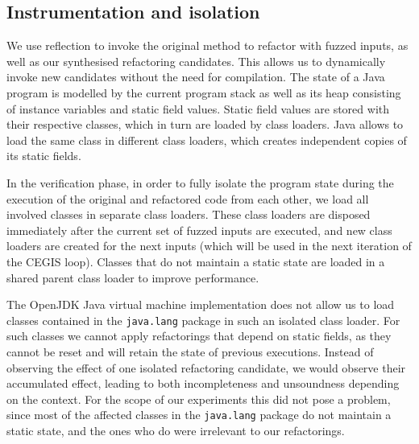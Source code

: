 \documentclass[10pt,conference]{IEEEtran}
\begin{document}
\subsection{Instrumentation and isolation}

We use reflection to invoke the original method to refactor with fuzzed inputs,
as well as our synthesised refactoring candidates. This allows us to dynamically
invoke new candidates without the need for compilation. The state of a Java
program is modelled by the current program stack as well as its heap consisting
of instance variables and static field values. Static field values are stored
with their respective classes, which in turn are loaded by class loaders. Java
allows to load the same class in different class loaders, which creates
independent copies of its static fields.

In the verification phase, in order to fully isolate the program state during the execution of the original and refactored code from each other, we load all involved classes in separate
class loaders. These class loaders are disposed immediately after the current set
of fuzzed inputs are executed, and new class loaders are created for the next
inputs (which will be used in the next iteration of the CEGIS loop).
Classes that do not maintain a static state are loaded in a shared
parent class loader to improve performance.

The OpenJDK Java virtual machine implementation does not allow us to load
classes contained in the \texttt{java.lang} package in such an isolated class
loader. For such classes we cannot apply refactorings that depend on static
fields, as they cannot be reset and will retain the state of previous
executions. Instead of observing the effect of one isolated refactoring
candidate, we would observe their accumulated effect, leading to both
incompleteness and unsoundness depending on the context. For the scope of our
experiments this did not pose a problem, since most of the affected classes in
the \texttt{java.lang} package do not maintain a static state, and the ones who do
were irrelevant to our refactorings.



\end{document}
